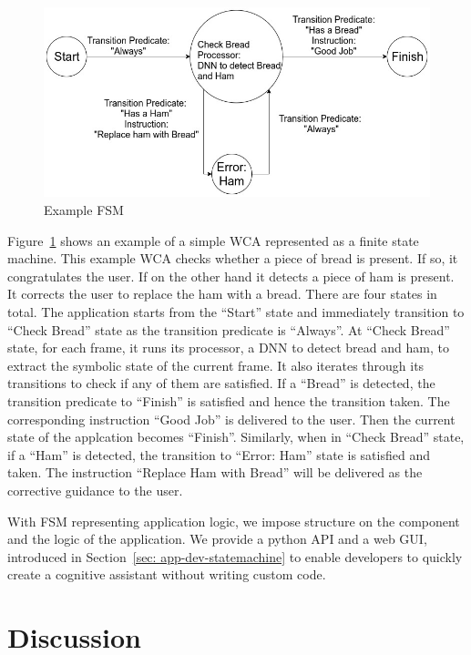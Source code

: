 \begin{figure}
  \centering
  \includegraphics[trim={0 0 0 0},width=\linewidth]{FIGS/fsm-example}
	\caption{Example FSM}
    \label{figs:fsm-example}
\end{figure}

Figure~\ref{figs:fsm-example} shows an example of a simple WCA represented as a
finite state machine. This example WCA checks whether a piece of bread is
present. If so, it congratulates the user. If on the other hand it detects a
piece of ham is present. It corrects the user to replace the ham with a bread.
There are four states in total. The application starts from the ``Start'' state
and immediately transition to ``Check Bread'' state as the transition predicate
is ``Always''. At ``Check Bread'' state, for each frame, it runs its processor,
a DNN to detect bread and ham, to extract the symbolic state of the current
frame. It also iterates through its transitions to check if any of them are
satisfied. If a ``Bread'' is detected, the transition predicate to ``Finish'' is
satisfied and hence the transition taken. The corresponding instruction ``Good
Job'' is delivered to the user. Then the current state of the applcation becomes
``Finish''. Similarly, when in ``Check Bread'' state, if a ``Ham'' is detected,
the transition to ``Error: Ham'' state is satisfied and taken. The instruction
``Replace Ham with Bread'' will be delivered as the corrective guidance to the
user.

With FSM representing application logic, we impose structure on the component
and the logic of the application. We provide a python API and a web GUI,
introduced in Section~\ref{sec: app-dev-statemachine} to enable developers to
quickly create a cognitive assistant without writing custom code. 



\section{Discussion}
